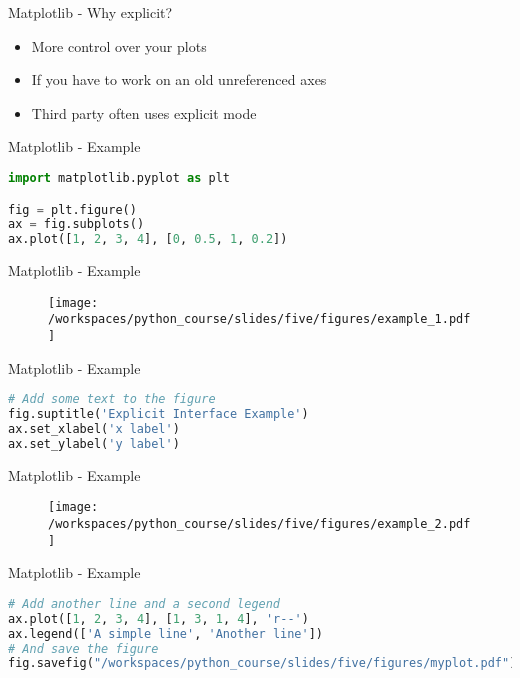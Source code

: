 \documentclass{beamer}
\begin{document}
\begin{frame}{Matplotlib - Why explicit?}
    \begin{itemize}
        \item  <1-> More control over your plots
        \item  <2-> If you have to work on an old unreferenced axes 
        \item  <3-> Third party often uses explicit mode
    \end{itemize}
\end{frame}

\begin{frame}[fragile]{Matplotlib - Example}
    \begin{lstlisting}[language=Python, backgroundcolor = \color{lightgray}]
import matplotlib.pyplot as plt

fig = plt.figure()
ax = fig.subplots()
ax.plot([1, 2, 3, 4], [0, 0.5, 1, 0.2])
    \end{lstlisting}

\end{frame}

\begin{frame}{Matplotlib - Example}
    \begin{figure}
        \centering
        \texttt{[image: /workspaces/python\_course/slides/five/figures/example\_1.pdf]}
    \end{figure}
\end{frame}


\begin{frame}[fragile]{Matplotlib - Example}
    \begin{lstlisting}[language=Python, backgroundcolor = \color{lightgray}]
# Add some text to the figure
fig.suptitle('Explicit Interface Example')
ax.set_xlabel('x label')
ax.set_ylabel('y label')
    \end{lstlisting}

\end{frame}

\begin{frame}{Matplotlib - Example}
    \begin{figure}
        \centering
        \texttt{[image: /workspaces/python\_course/slides/five/figures/example\_2.pdf]}
    \end{figure}
\end{frame}

\begin{frame}[fragile]{Matplotlib - Example}
    \begin{lstlisting}[language=Python, backgroundcolor = \color{lightgray},
        columns=fullflexible,
        breaklines=true,]
# Add another line and a second legend
ax.plot([1, 2, 3, 4], [1, 3, 1, 4], 'r--')
ax.legend(['A simple line', 'Another line'])
# And save the figure
fig.savefig("/workspaces/python_course/slides/five/figures/myplot.pdf")
    \end{lstlisting}

\end{frame}
\end{document}
